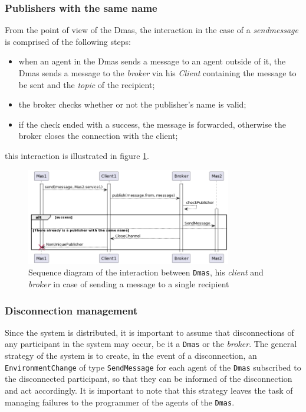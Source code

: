 \subsubsection{Publishers with the same name} \label{sec:publishers-same-name}

From the point of view of the Dmas, the interaction in the case of a \textit{sendmessage} is comprised of the following steps:
\begin{itemize}
    \item when an agent in the Dmas sends a message to an agent outside of it, the Dmas sends a message to the \textit{broker} via his \textit{Client} containing the message to be sent and the \textit{topic} of the recipient;
    \item the broker checks whether or not the publisher's name is valid;
    \item if the check ended with a success, the message is forwarded, otherwise the broker closes the connection with the client;
\end{itemize}

this interaction is illustrated in figure \ref{fig:interaction-sendmessage-pov}.

\begin{figure}[ht!]
    \centering
    \includegraphics[width=0.8\textwidth]{figures/interaction-sendmessage-pov.png}
    \caption{Sequence diagram of the interaction between \texttt{Dmas}, his \textit{client} and \textit{broker} in case of sending a message to a single recipient}
    \label{fig:interaction-sendmessage-pov}
\end{figure}


\subsubsection{Disconnection management}
Since the system is distributed, it is important to assume that disconnections of any participant in the system may occur, be it a \texttt{Dmas} or the \textit{broker}.
The general strategy of the system is to create, in the event of a disconnection, an \texttt{EnvironmentChange} of type \texttt{SendMessage} for each agent of the \texttt{Dmas} subscribed to the
disconnected participant, so that they can be informed of the disconnection and act accordingly. It is important to note that this strategy leaves the task of managing failures to the programmer of the agents of the \texttt{Dmas}.

